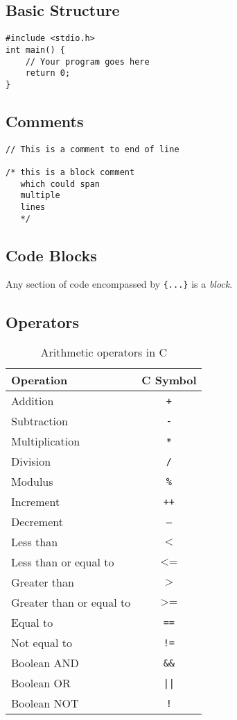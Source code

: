\documentclass{lab}
\begin{document}
\begin{multicols}{2}
\subsection{Basic Structure}
\begin{lstlisting}[style=CStyle]
#include <stdio.h>
int main() {
	// Your program goes here
	return 0;
}
\end{lstlisting}
\subsection{Comments}
\begin{lstlisting}[style=CStyle]
// This is a comment to end of line

/* this is a block comment
   which could span
   multiple
   lines
   */
\end{lstlisting}

\subsection{Code Blocks}

Any section of code encompassed by \texttt{\{...\}} is a \textit{block}.

\subsection{Operators}

\begin{table}[H]
\centering
\begin{tabular}{|l|c|}
\hline
Operation      & C Symbol \\
\hline
Addition       & \texttt{+}        \\
Subtraction    & \texttt{-}        \\
Multiplication & \texttt{*}        \\
Division       & \texttt{/}       \\
Modulus		   & \texttt{\%}	\\
Increment	& \texttt{++}	\\
Decrement	& \texttt{--} \\
Less than       & $\texttt{<}$        \\
Less than or equal to    & $\texttt{<=}$\\
Greater than & $\texttt{>}$        \\
Greater than or equal to       & $\texttt{>=}$ \\
Equal to & \texttt{==} \\
Not equal to & \texttt{!=} \\
Boolean AND & \texttt{\&\&} \\
Boolean OR & \texttt{||} \\
Boolean NOT & \texttt{!} \\
\hline
\end{tabular}
\caption{Arithmetic operators in C}
\end{table}


\end{multicols}
\end{document}
